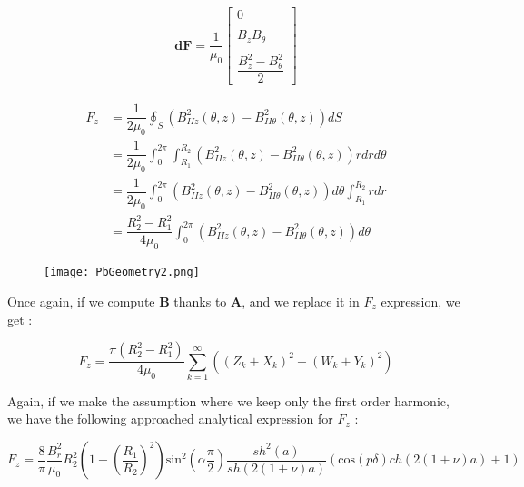 \begin{figure}[H]

    \begin{minipage}[c]{0.4\textwidth}
    \begin{align*}
        \mathbf{dF} = \dfrac{1}{\mu_0}
\begin{bmatrix}
 0 \\ \\ B_z B_{\theta} \\ \\ \dfrac{B_z^2-B^2_{\theta}}{2}
\end{bmatrix}
    \end{align*}
    \end{minipage}
    \hfill
        \begin{minipage}[c]{0.58\textwidth}
    \begin{align*}
    F_z &=\dfrac{1}{2\mu_0}\oint_S \left(B^2_{IIz}(\theta,z)-B^2_{II\theta}(\theta,z)\right) dS \\
    &= \dfrac{1}{2\mu_0}\int_0^{2\pi}\int_{R_1}^{R_2}\left(B^2_{IIz}(\theta,z)-B^2_{II\theta}(\theta,z)\right)rdrd\theta \\
    &=\dfrac{1}{2\mu_0}\int_0^{2\pi}\left(B^2_{IIz}(\theta,z)-B^2_{II\theta}(\theta,z)\right)d\theta\int_{R_1}^{R_2}rdr \\
    &=\dfrac{R_2^2-R_1^2}{4\mu_0}\int_0^{2\pi}\left(B^2_{IIz}(\theta,z)-B^2_{II\theta}(\theta,z)\right)d\theta
    \end{align*}
    \end{minipage}
\end{figure}

\begin{figure}[H]
    \centering
    \texttt{[image: PbGeometry2.png]}
\end{figure}

Once again, if we compute $\mathbf{B}$ thanks to $\mathbf{A}$, and we replace it in $F_z$ expression, we get : 

\begin{equation*}
F_z = \dfrac{\pi\left(R_2^2-R_1^2\right)}{4\mu_0}\sum_{k=1}^{\infty}\left(\left(Z_k+X_k\right)^2-\left(W_k+Y_k\right)^2\right)    
\end{equation*}

Again, if we make the assumption where we keep only the first order harmonic, we have the following approached analytical expression for $F_z$ : 

\begin{equation*}
    F_z = \dfrac{8}{\pi}\dfrac{B^2_r}{\mu_0}R_2^2\left(1-\left(\dfrac{R_1}{R_2}\right)^2\right) \text{sin}^2\left(\alpha\dfrac{\pi}{2}\right)\dfrac{sh^2(a)}{sh(2(1+\nu)a)} \left(\text{cos}(p\delta)ch(2(1+\nu)a)+1\right)
\end{equation*}


